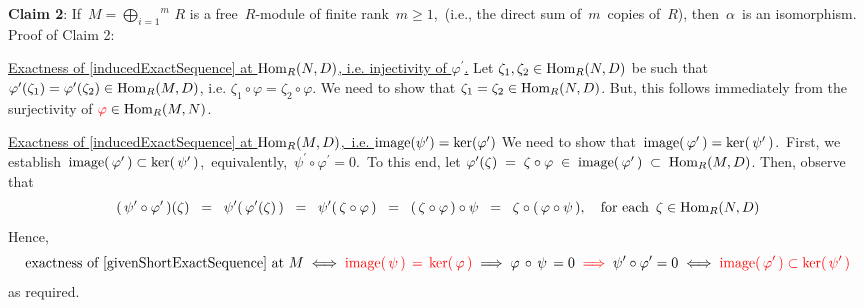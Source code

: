 \begin{enumerate}
	\vskip 0.3cm
	\textbf{Claim 2}:\;\; If \,$M = \overset{m}{\underset{i =1}{\bigoplus}}\, R$ is a free \,$R$-module of finite rank \,$m \geq 1$,\,
	(i.e., the direct sum of \,$m$\, copies of \,$R$),
	then \,$\alpha$\, is an isomorphism.
	\vskip 0.01cm
	Proof of Claim 2:\;\;

\end{enumerate}

\vskip 0.25cm
\noindent
\underline{Exactness of \eqref{inducedExactSequence} at $\textnormal{Hom}_{R}(N,D)$, i.e. {\color{red}injectivity of $\varphi^{\prime}$}{\color{white}.}}
\vskip 0.25cm
\noindent
Let $\zeta_{1}, \zeta_{2} \in \textnormal{Hom}_{R}(N,D)$ be such that
$\varphi^{\prime}(\zeta_{1}) = \varphi^{\prime}(\zeta_{2}) \in \textnormal{Hom}_{R}(M,D)$, i.e.
$\zeta_{1} \circ \varphi = \zeta_{2} \circ \varphi$.
We need to show that $\zeta_{1} = \zeta_{2} \in \textnormal{Hom}_{R}(N,D)$.
But, this follows immediately from the {\color{red}surjectivity of} ${\color{red}\varphi} \in \textnormal{Hom}_{R}(M,N)$.


\vskip 0.50cm
\noindent
\underline{Exactness of \eqref{inducedExactSequence} at $\textnormal{Hom}_{R}(M,D)$,\, i.e. $\textnormal{image}(\psi^{\prime}) = \ker(\varphi^{\prime})$}
\vskip 0.25cm
\noindent
We need to show that \,$\textnormal{image}(\,\varphi^{\prime}\,) = \ker(\,\psi^{\prime}\,)$.\,
First, we establish \,$\textnormal{image}(\,\varphi^{\prime}\,) \subset \ker(\,\psi^{\prime}\,)$,\,
equivalently, \,$\psi^{\prime} \circ \varphi^{\prime} = 0$.\,
To this end, let
$\varphi^{\prime}(\zeta) \;=\; \zeta \circ \varphi \;\in\; \textnormal{image}(\,\varphi^{\prime}\,) \;\subset\; \textnormal{Hom}_{R}(M,D)$.
Then, observe that
\begin{equation*}
(\,\psi^{\prime}\circ\varphi^{\prime}\,)(\zeta)
\;\; = \;\;
	\psi^{\prime}(\,\varphi^{\prime}(\zeta)\,)
\;\; = \;\;
	\psi^{\prime}(\,\zeta \circ \varphi\,)
\;\; = \;\;
	(\,\zeta \circ \varphi\,) \circ \psi
\;\; = \;\;
	\zeta \circ (\,\varphi \circ \psi\,),
\quad
	\textnormal{for each \,$\zeta \in \textnormal{Hom}_{R}(N,D)$}
\end{equation*}
Hence,
\begin{equation*}
\textnormal{exactness of \eqref{givenShortExactSequence} at $M$}
\; \Longleftrightarrow \;
	{\color{red}\textnormal{image}(\,\psi\,) \,=\, \ker(\,\varphi\,)}
\; \Longrightarrow \;
	\varphi \,\circ\, \psi \,= 0
\;\; {\color{red}\Longrightarrow} \;\;
	\psi^{\prime} \circ \varphi^{\prime} = 0
\; \Longleftrightarrow \;
	{\color{red}\textnormal{image}(\,\varphi^{\prime}\,) \subset \ker(\,\psi^{\prime}\,)}
\end{equation*}
as required.

